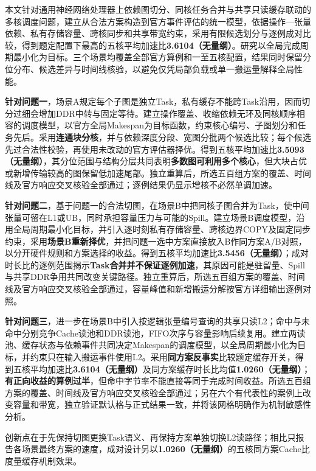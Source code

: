 本文针对通用神经网络处理器上依赖图切分、同核任务合并与共享只读缓存联动的多核调度问题，建立从合法方案构造到官方事件评估的统一模型，依据操作—张量依赖、私有存储容量、跨核同步和共享带宽约束，采用有限候选划分与逐例成对比较，得到题定配置下最高的五核平均加速比\textbf{3.6104（无量纲）}。研究以全局完成周期最小化为目标。三个场景均覆盖全部官方算例和一至五核配置，结果同时保留分位分布、候选差异与时间线核验，以避免仅凭局部负载或单一搬运量解释全局性能。

\textbf{针对问题一}，场景A规定每个子图是独立Task，私有缓存不能跨Task沿用，因而切分过细会增加DDR中转与固定等待。建立操作覆盖、收缩依赖无环及同核顺序相容的调度模型，以官方全局Makespan为目标函数，约束核心编号、子图划分和任务先后。采用\textbf{连通块分核}，并与依赖深度分段、宽图分批两个候选比较；每个候选先过合法性校验，再使用未改动的官方评估器择优。得到五核平均加速比\textbf{3.5093（无量纲）}，其分位范围与结构分层共同表明\textbf{多数图可利用多个核心}，但大块占优或新增传输较高的图保留低加速尾部。独立重算后，所选五百组方案的覆盖、时间线及官方响应交叉核验全部通过；逐例结果仍显示增核不必然单调加速。

\textbf{针对问题二}，基于问题一的合法切图，在场景B中把同核子图合并为Task，使中间张量可留在L1或UB，同时承担容量压力与可能的Spill。建立场景B调度模型，沿用全局周期最小化目标，并引入逐时刻私有存储容量、跨核边界COPY及固定同步约束，采用\textbf{场景B重新择优}，并把问题一选中方案直接放入B作同方案A/B对照，以分开硬件规则和方案选择的收益。得到五核平均加速比\textbf{3.5456（无量纲）}；成对时长比的逐例范围揭示\textbf{Task合并并不保证逐例加速}，其原因可能是驻留量、Spill与共享DDR争用共同改变关键路径。独立重算后，所选五百组方案的覆盖、时间线及官方响应交叉核验全部通过，容量峰值和新增搬运分解按官方详细输出逐例对照。

\textbf{针对问题三}，进一步在场景B中引入按逻辑张量编号查询的共享只读L2；命中与未命中分别竞争Cache读池和DDR读池，FIFO次序与容量影响后续复用。建立两读池、缓存状态与依赖事件共同决定Makespan的调度模型，以全局周期最小化为目标，并约束只在输入搬运事件使用L2。采用\textbf{同方案反事实}比较题定缓存开关，得到五核平均加速比\textbf{3.6104（无量纲）}及同方案缓存时长比均值\textbf{1.0260（无量纲）}；\textbf{有正向收益的算例过半}，但命中字节率不能直接等同于完成时间收益。所选五百组方案的覆盖、时间线及官方响应交叉核验全部通过；另在六个有代表性的案例上改变容量和带宽，独立验证默认格与正式结果一致，并将该网格明确作为机制敏感性分析。

创新点在于先保持切图更换Task语义、再保持方案单独切换L2读路径；相比只报告各场景最终方案的速度，成对设计另以\textbf{1.0260（无量纲）}的五核同方案Cache比度量缓存机制效果。

